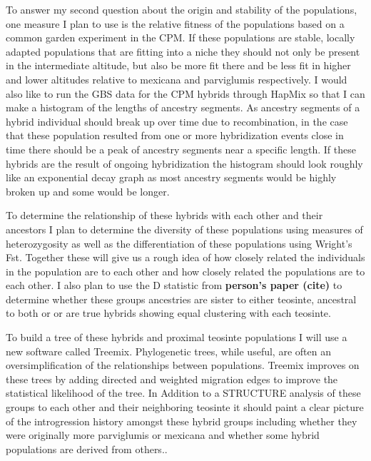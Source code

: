 \documentclass[12pt]{amsart}
\begin{document}
To answer my second question about the origin and stability of the populations, one measure I plan to use is the relative fitness of the populations based on a common garden experiment in the CPM. 
If these populations are stable, locally adapted populations that are fitting into a niche they should not only be present in the intermediate altitude, but also be more fit there and be less fit in higher and lower altitudes relative to mexicana and parviglumis respectively.
I would also like to run the GBS data for the CPM hybrids through HapMix so that I can make a histogram of the lengths of ancestry segments.  
As ancestry segments of a hybrid individual should break up over time due to recombination, in the case that these population resulted from one or more hybridization events close in time there should be a peak of ancestry segments near a specific length.
If these hybrids are the result of ongoing hybridization the histogram should look roughly like an exponential decay graph as most ancestry segments would be highly broken up and some would be longer.%

To determine the relationship of these hybrids with each other and their ancestors I plan to determine the diversity of these populations using measures of heterozygosity as well as the differentiation of these populations using Wright's Fst.  
Together these will give us a rough idea of how closely related the individuals in the population are to each other and how closely related the populations are to each other.
I also plan to use the D statistic from \textbf{person's paper (cite)} to determine whether these groups ancestries are sister to either teosinte, ancestral to both or or are true hybrids showing equal clustering with each teosinte.

To build a tree of these hybrids and proximal teosinte populations I will use a new software called Treemix.
Phylogenetic trees, while useful, are often an oversimplification of the relationships between populations.%
Treemix improves on these trees by adding directed and weighted migration edges to improve the statistical likelihood of the tree.
In Addition to a STRUCTURE analysis of these groups to each other and their neighboring teosinte it should paint a clear picture of the introgression history amongst these hybrid groups including whether they were originally more parviglumis or mexicana and whether some hybrid populations are derived from others..
\end{document}
